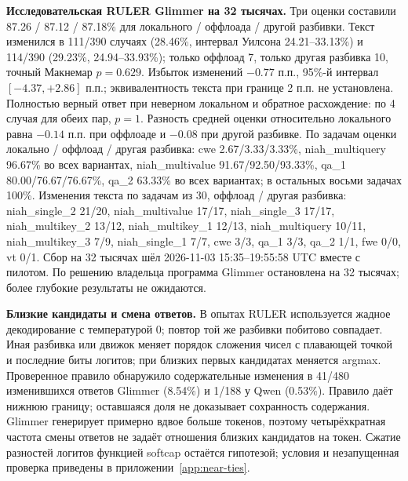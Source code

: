 \textbf{Исследовательская RULER Glimmer на 32 тысячах.} Три оценки составили
87.26 / 87.12 / 87.18\% для локального / оффлоада / другой разбивки.
Текст изменился в 111/390 случаях (28.46\%, интервал Уилсона 24.21--33.13\%)
и 114/390 (29.23\%, 24.94--33.93\%); только оффлоад 7, только другая разбивка 10,
точный Макнемар $p=0.629$. Избыток изменений $-0.77$ п.п., 95\%-й интервал $[-4.37,+2.86]$ п.п.;
эквивалентность текста при границе 2 п.п. не установлена.
Полностью верный ответ при неверном локальном и обратное расхождение: по 4 случая для обеих пар, $p=1$.
Разность средней оценки относительно локального равна $-0.14$ п.п. при оффлоаде и $-0.08$ при другой разбивке.
По задачам оценки локально / оффлоад / другая разбивка: cwe 2.67/3.33/3.33\%,
niah\_multiquery 96.67\% во всех вариантах, niah\_multivalue 91.67/92.50/93.33\%,
qa\_1 80.00/76.67/76.67\%, qa\_2 63.33\% во всех вариантах; в остальных восьми задачах 100\%.
Изменения текста по задачам из 30, оффлоад / другая разбивка: niah\_single\_2 21/20,
niah\_multivalue 17/17, niah\_single\_3 17/17, niah\_multikey\_2 13/12,
niah\_multikey\_1 12/13, niah\_multiquery 10/11, niah\_multikey\_3 7/9,
niah\_single\_1 7/7, cwe 3/3, qa\_1 3/3, qa\_2 1/1, fwe 0/0, vt 0/1.
Сбор на 32 тысячах шёл 2026-11-03 15:35--19:55:58 UTC вместе с пилотом.
По решению владельца программа Glimmer остановлена на 32 тысячах; более глубокие результаты не ожидаются.

\textbf{Близкие кандидаты и смена ответов.} В опытах RULER используется жадное декодирование
с температурой 0; повтор той же разбивки побитово совпадает. Иная разбивка или движок меняет порядок
сложения чисел с плавающей точкой и последние биты логитов; при близких первых кандидатах меняется argmax.
Проверенное правило обнаружило содержательные изменения в 41/480 изменившихся ответов Glimmer (8.54\%)
и 1/188 у Qwen (0.53\%). Правило даёт нижнюю границу; оставшаяся доля не доказывает сохранность содержания.
Glimmer генерирует примерно вдвое больше токенов, поэтому четырёхкратная частота смены ответов
не задаёт отношения близких кандидатов на токен. Сжатие разностей логитов функцией softcap остаётся гипотезой;
условия и незапущенная проверка приведены в приложении~\ref{app:near-ties}.

